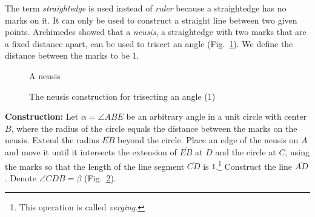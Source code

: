 The term \emph{straightedge} is used instead of \emph{ruler} because a straightedge has no marks on it. It can only be used to construct a straight line between two given points. Archimedes showed that a \emph{neusis}, a straightedge with two marks that are a fixed distance apart, can be used to trisect an angle (Fig.~\ref{f.neusis}). We define the distance between the marks to be $1$.

\begin{figure}[b]
\begin{center}
\end{center}
\caption{A neusis}\label{f.neusis}
\end{figure}

\begin{figure}[t]
\begin{center}
\end{center}
\caption{The neusis construction for trisecting an angle (1)}\label{f.trisect-neusis-1}
\end{figure}
\noindent\textbf{Construction:}
Let $\alpha=\angle ABE$ be an arbitrary angle in a unit circle with center $B$, where the radius of the circle equals the distance between the marks on the neusis. Extend the radius $\overline{EB}$ beyond the circle. Place an edge of the neusis on $A$ and move it until it intersects the extension of $\overline{EB}$ at $D$ and the circle at $C$, using the marks so that the length of the line segment $\overline{CD}$ is $1$.\footnote{This operation is called \emph{verging}.} Construct the line $\overline{AD}$. Denote $\angle CDB=\beta$ (Fig.~\ref{f.trisect-neusis-1}).

